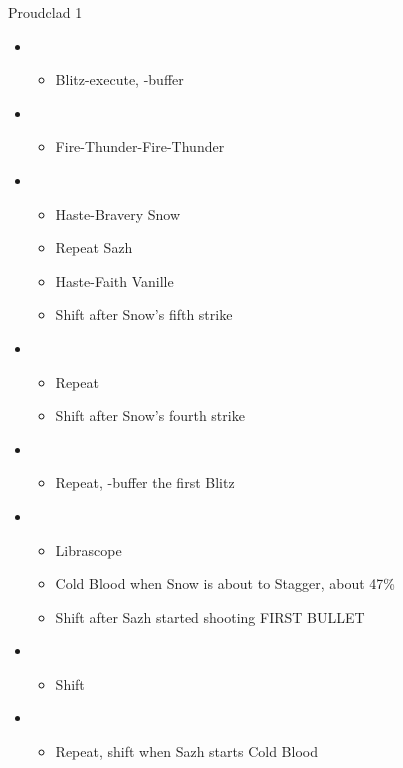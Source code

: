 \begin{multicols}{2}
\begin{battle}{Proudclad 1}
\begin{itemize}
    \item \second
    \begin{itemize}
        \item Blitz-execute, \rav-buffer
    \end{itemize}
    \item \sixth
    \begin{itemize}
        \item Fire-Thunder-Fire-Thunder
    \end{itemize}
    \item \fourth
    \begin{itemize}
        \item Haste-Bravery Snow
        \item Repeat Sazh
        \item Haste-Faith Vanille
        \item Shift after Snow's fifth strike
    \end{itemize}
    \item \sixth
    \begin{itemize}
        \item Repeat
        \item Shift after Snow's fourth strike
    \end{itemize}
    \item \first
    \begin{itemize}
        \item Repeat, \rav-buffer the first Blitz
    \end{itemize}
    \item \fifth
    \begin{itemize}
        \item Librascope
        \item Cold Blood when Snow is about to Stagger, about 47\%
        \item Shift after Sazh started shooting FIRST BULLET
    \end{itemize}
    \item \sixth
    \begin{itemize}
        \item Shift
    \end{itemize}
    \item \fifth
    \begin{itemize}
        \item Repeat, shift when Sazh starts Cold Blood
    \end{itemize}

\end{itemize}
\end{battle}
\end{multicols}
